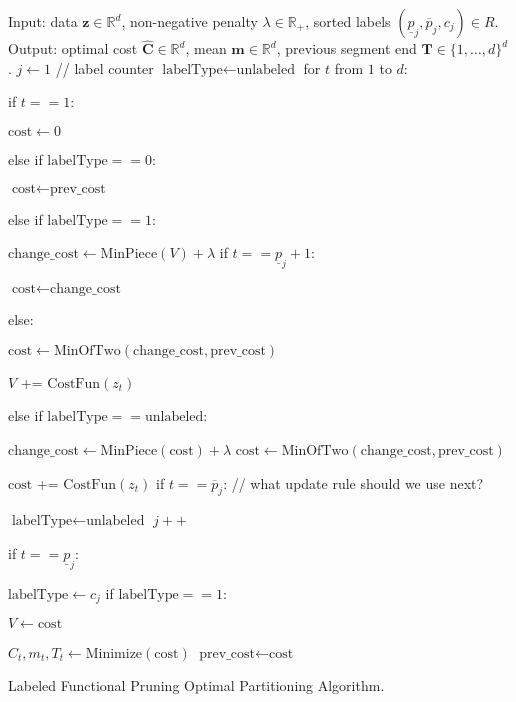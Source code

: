 \documentclass{article}
\newcommand{\RR}{\mathbb R}
\begin{document}
\begin{algorithm}[H]
\begin{algorithmic}[1]
\STATE Input: data $\mathbf z\in\mathbb R^d$, 
non-negative penalty $\lambda\in\RR_+$,
sorted labels $(\underline p_j, \overline p_j, c_j)\in R$.
\STATE Output: optimal cost $\hat{\mathbf C}\in\mathbb R^d$,
mean $\mathbf m\in\mathbb R^d$,
previous segment end $\mathbf T\in\{1,\dots,d\}^d$. 
\STATE $j\gets 1$ // label counter
\STATE $\text{labelType}\gets\text{unlabeled}$
\STATE for $t$ from $1$ to $d$:
\begin{ALC@g}
  \STATE if $t==1$:
  \begin{ALC@g}
    \STATE $\text{cost}\gets 0$
  \end{ALC@g}
  \STATE else if $\text{labelType}==0$:
  \begin{ALC@g}
    \STATE $\text{cost}\gets\text{prev\_cost}$
  \end{ALC@g}
  \STATE else if $\text{labelType}==1$:
  \begin{ALC@g}
    \STATE $\text{change\_cost}\gets \text{MinPiece}(V) + \lambda$
    \STATE if $t==\underline p_j+1$:
    \begin{ALC@g}
      \STATE $\text{cost}\gets\text{change\_cost}$
    \end{ALC@g}
    \STATE else:
    \begin{ALC@g}
      \STATE $\text{cost}\gets\text{MinOfTwo}(
      \text{change\_cost}, \text{prev\_cost})$
    \end{ALC@g}
    \STATE $V$ += $\text{CostFun}(z_t)$
  \end{ALC@g}
  \STATE else if $\text{labelType}==\text{unlabeled}$:
  \begin{ALC@g}
    \STATE $\text{change\_cost}\gets\text{MinPiece}(\text{cost}) + \lambda$
    \STATE $\text{cost}\gets\text{MinOfTwo}( 
    \text{change\_cost}, \text{prev\_cost})$
  \end{ALC@g}
  \STATE $\text{cost}$ += $\text{CostFun}(z_t)$
  \STATE if $t==\overline p_j$: // what update rule should we use next?
  \begin{ALC@g}
    \STATE $\text{labelType}\gets \text{unlabeled}$
    \STATE $j++$
  \end{ALC@g}
  \STATE if $t==\underline p_j$:
  \begin{ALC@g}
    \STATE $\text{labelType}\gets c_j$
    \STATE if $\text{labelType}==1$:
    \begin{ALC@g}
      \STATE $V\gets \text{cost}$
    \end{ALC@g}
  \end{ALC@g}
  \STATE $\hat C_t, m_t, T_t\gets \text{Minimize}(\text{cost})$
  \STATE $\text{prev\_cost}\gets\text{cost}$
\end{ALC@g}
\caption{\label{algo:LabeledFPOP}Labeled Functional Pruning Optimal
  Partitioning Algorithm.}
\end{algorithmic}
\end{algorithm}



\end{document}

